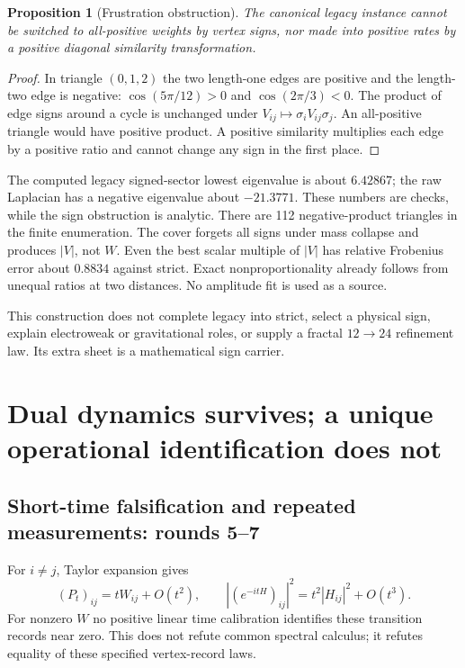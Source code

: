 \documentclass[11pt,a4paper]{article}
\newtheorem{proposition}[theorem]{Proposition}
\begin{document}
\begin{proposition}[Frustration obstruction]
The canonical legacy instance cannot be switched to all-positive weights
by vertex signs, nor made into positive rates by a positive diagonal
similarity transformation.
\end{proposition}
\begin{proof}
In triangle $(0,1,2)$ the two length-one edges are positive and the
length-two edge is negative: $\cos(5\pi/12)>0$ and
$\cos(2\pi/3)<0$. The product of edge signs around a cycle is unchanged
under $V_{ij}\mapsto\sigma_iV_{ij}\sigma_j$. An all-positive triangle
would have positive product. A positive similarity multiplies each edge by
a positive ratio and cannot change any sign in the first place.
\end{proof}

The computed legacy signed-sector lowest eigenvalue is about $6.42867$;
the raw Laplacian has a negative eigenvalue about $-21.3771$.
These numbers are checks, while the sign obstruction is analytic.
There are 112 negative-product triangles in the finite enumeration.
The cover forgets all signs under mass collapse and produces $|V|$, not
$W$. Even the best scalar multiple of $|V|$ has relative Frobenius error
about $0.8834$ against strict. Exact nonproportionality already follows
from unequal ratios at two distances. No amplitude fit is used as a source.

This construction does not complete legacy into strict, select a physical
sign, explain electroweak or gravitational roles, or supply a fractal
$12\to24$ refinement law. Its extra sheet is a mathematical sign carrier.

\section{Dual dynamics survives; a unique operational identification does not}
\label{sec:quantum}

\subsection{Short-time falsification and repeated measurements: rounds 5--7}

For $i\ne j$, Taylor expansion gives
\[
 (P_t)_{ij}=tW_{ij}+O(t^2),\qquad
 |(e^{-itH})_{ij}|^2=t^2|H_{ij}|^2+O(t^3).
\]
For nonzero $W$ no positive linear time calibration identifies these
transition records near zero. This does not refute common spectral calculus;
it refutes equality of these specified vertex-record laws.
\end{document}
